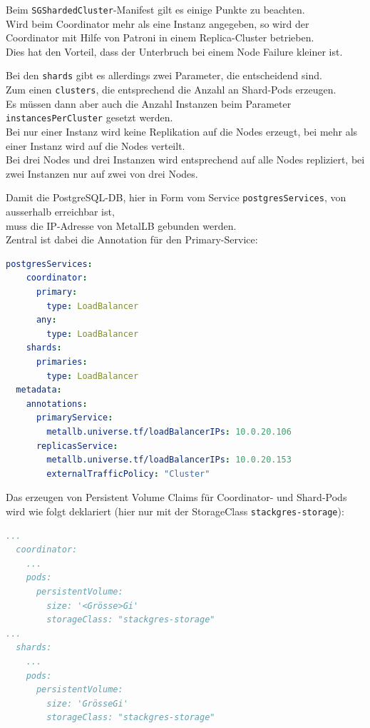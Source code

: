 \begin{flushleft}
    Beim \texttt{SGShardedCluster}-Manifest gilt es einige Punkte zu beachten.\\
    Wird beim Coordinator mehr als eine Instanz angegeben, so wird der Coordinator mit Hilfe von Patroni in einem Replica-Cluster betrieben.\\Dies hat den Vorteil, dass der Unterbruch bei einem Node Failure kleiner ist.
\end{flushleft}
\begin{flushleft}
    Bei den \texttt{shards} gibt es allerdings zwei Parameter, die entscheidend sind.\\Zum einen \texttt{clusters}, die entsprechend die Anzahl an Shard-Pods erzeugen.\\
    Es müssen dann aber auch die Anzahl Instanzen beim Parameter \texttt{instancesPerCluster} gesetzt werden.\\Bei nur einer Instanz wird keine Replikation auf die Nodes erzeugt, bei mehr als einer Instanz wird auf die Nodes verteilt.\\
    Bei drei Nodes und drei Instanzen wird entsprechend auf alle Nodes repliziert, bei zwei Instanzen nur auf zwei von drei Nodes.
\end{flushleft}
\begin{flushleft}
    Damit die PostgreSQL-DB, hier in Form vom Service \texttt{postgresServices}, von ausserhalb erreichbar ist,\\muss die IP-Adresse von \Gls{MetalLB} gebunden werden.\\
    Zentral ist dabei die Annotation für den Primary-Service:
\lstset{style=gra_codestyle}
\begin{lstlisting}[language=yaml, caption=StackGres-Citus - LoadBalancer -Annotation,captionpos=b,label={lst:stackgres-citus-loadbalancer-annotation},breaklines=true]
  postgresServices:
    coordinator:
      primary:
        type: LoadBalancer
      any:
        type: LoadBalancer
    shards:
      primaries:
        type: LoadBalancer
  metadata:
    annotations:
      primaryService:
        metallb.universe.tf/loadBalancerIPs: 10.0.20.106
      replicasService:
        metallb.universe.tf/loadBalancerIPs: 10.0.20.153
        externalTrafficPolicy: "Cluster"
\end{lstlisting}
\end{flushleft}
\begin{flushleft}
    Das erzeugen von Persistent Volume Claims für Coordinator- und Shard-Pods wird wie folgt deklariert (hier nur mit der StorageClass \texttt{stackgres-storage}):
\lstset{style=gra_codestyle}
\begin{lstlisting}[language=yaml, caption=StackGres-Citus - StorageClass -PVC Binding,captionpos=b,label={lst:stackgres-citus-storageclass-pvc},breaklines=true]
...
  coordinator:
    ...
    pods:
      persistentVolume:
        size: '<Grösse>Gi'
        storageClass: "stackgres-storage"
...
  shards:
    ...
    pods:
      persistentVolume:
        size: 'GrösseGi'
        storageClass: "stackgres-storage"
\end{lstlisting}
\end{flushleft}
